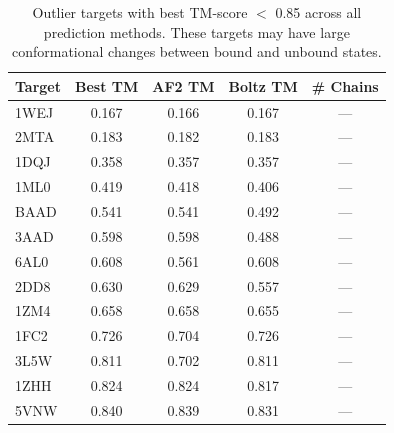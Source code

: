 \begin{table}[htbp]
\centering
\caption{Outlier targets with best TM-score $<$ 0.85 across all prediction methods. These targets may have large conformational changes between bound and unbound states.}
\label{tab:outliers}
\begin{tabular}{lcccc}
\toprule
Target & Best TM & AF2 TM & Boltz TM & \# Chains \\
\midrule
  1WEJ & 0.167 & 0.166 & 0.167 & --- \\
  2MTA & 0.183 & 0.182 & 0.183 & --- \\
  1DQJ & 0.358 & 0.357 & 0.357 & --- \\
  1ML0 & 0.419 & 0.418 & 0.406 & --- \\
  BAAD & 0.541 & 0.541 & 0.492 & --- \\
  3AAD & 0.598 & 0.598 & 0.488 & --- \\
  6AL0 & 0.608 & 0.561 & 0.608 & --- \\
  2DD8 & 0.630 & 0.629 & 0.557 & --- \\
  1ZM4 & 0.658 & 0.658 & 0.655 & --- \\
  1FC2 & 0.726 & 0.704 & 0.726 & --- \\
  3L5W & 0.811 & 0.702 & 0.811 & --- \\
  1ZHH & 0.824 & 0.824 & 0.817 & --- \\
  5VNW & 0.840 & 0.839 & 0.831 & --- \\
\bottomrule
\end{tabular}
\end{table}